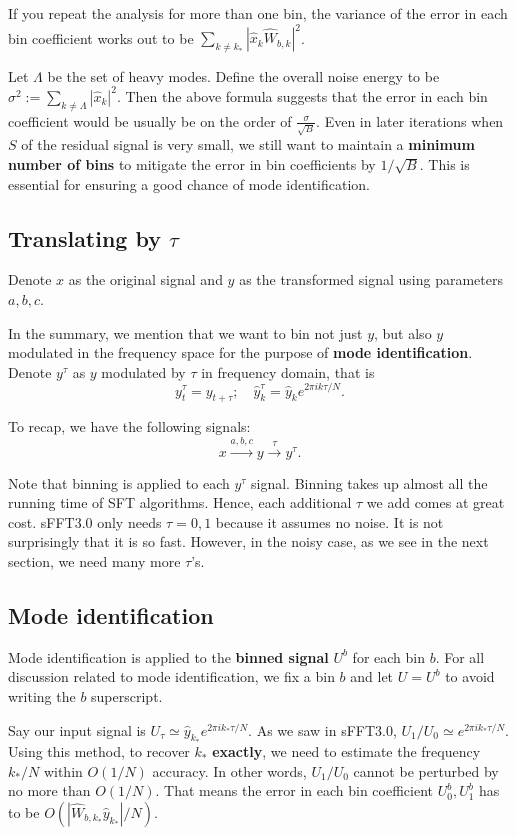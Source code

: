 \documentclass[10pt]{article}
\begin{document}
If you repeat the analysis for more than one bin, the variance of the error in each bin coefficient works out to be $\sum_{k\neq k_*} |\hat{x}_k \hat{W}_{b,k}|^2$.

Let $\Lambda$ be the set of heavy modes. Define the overall noise energy to be $\sigma^2 := \sum_{k\neq \Lambda} |\hat{x}_k|^2$. Then the above formula suggests that the error in each bin coefficient would be usually be on the order of $\frac{\sigma}{\sqrt{B}}$. Even in later iterations when $S$ of the residual signal is very small, we still want to maintain a \textbf{minimum number of bins} to mitigate the error in bin coefficients by $1/\sqrt{B}$. This is essential for ensuring a good chance of mode identification.

\subsection{Translating by $\tau$}

Denote $x$ as the original signal and $y$ as the transformed signal using parameters $a,b,c$.

In the summary, we mention that we want to bin not just $y$, but also $y$ modulated in the frequency space for the purpose of \textbf{mode identification}. Denote $y^{\tau}$ as $y$ modulated by $\tau$ in frequency domain, that is
$$y^{\tau}_{t} = y_{t+\tau}; \quad \hat{y}^{\tau}_k = \hat{y}_k e^{2\pi i k \tau/N}.$$

To recap, we have the following signals:
$$x \xrightarrow{a,b,c} y \xrightarrow{\tau} y^{\tau}.$$

Note that binning is applied to each $y^{\tau}$ signal. Binning takes up almost all the running time of SFT algorithms. Hence, each additional $\tau$ we add comes at great cost. sFFT3.0 only needs $\tau=0,1$ because it assumes no noise. It is not surprisingly that it is so fast. However, in the noisy case, as we see in the next section, we need many more $\tau$'s.

\subsection{Mode identification}

Mode identification is applied to the \textbf{binned signal} $U^b$ for each bin $b$. For all discussion related to mode identification, we fix a bin $b$ and let $U=U^b$ to avoid writing the $b$ superscript.

Say our input signal is $U_{\tau} \simeq \hat{y}_{k_*} e^{2\pi i k_* \tau/N}$. As we saw in sFFT3.0, $U_1/U_0 \simeq e^{2\pi i k_* \tau/N}$. Using this method, to recover $k_*$ \textbf{exactly}, we need to estimate the frequency $k_*/N$ within $O(1/N)$ accuracy. In other words, $U_1/U_0$ cannot be perturbed by no more than $O(1/N)$. That means the error in each bin coefficient $U_0^b,U_1^b$ has to be $O(|\hat{W}_{b,k_*}\hat{y}_{k_*}|/N)$.
\end{document}
